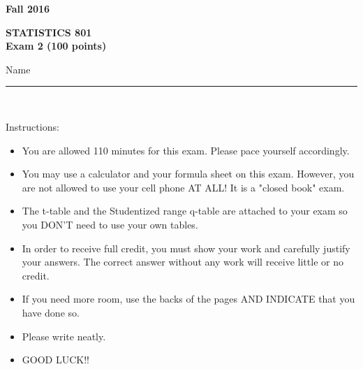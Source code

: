 \documentclass[12pt]{article}
\begin{document}
\begin{flushright}
\textbf{Fall 2016}\\[1.1in]
\end{flushright}

\begin{center}
\textbf{\Huge STATISTICS 801}\\[.1in]
\textbf{\large{Exam 2 (100 points)}}\\[.2in]
\end{center}
\raggedleft Name \rule{3.5in}{.01in}\\[1.1in]
\raggedright  Instructions: 
\begin{itemize}
\item	You are allowed 110 minutes for this exam. Please pace yourself accordingly. 
\item	You may use a calculator and your formula sheet on this exam. However, you are not allowed to use your cell phone AT ALL! It is a "closed book" exam.
\item	The t-table and the Studentized range q-table are attached to your exam so you DON'T need to use your own tables.
\item	In order to receive full credit, you must show your work and carefully justify your answers. The correct answer without any work will receive little or no credit.
\item	If you need more room, use the backs of the pages AND INDICATE that you have done so. 
\item	Please write neatly. 
\item	GOOD LUCK!!
\end{itemize}
\newpage
\setlength{\headsep}{0.2in}
\end{document}
